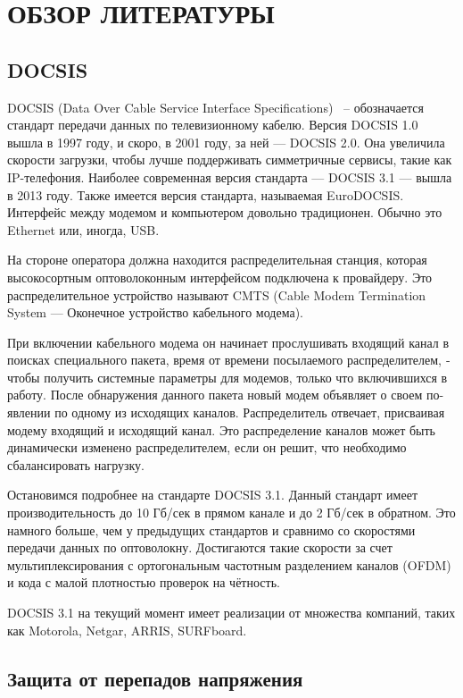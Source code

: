 \section{ОБЗОР ЛИТЕРАТУРЫ}
\label{sec:domain}

\subsection{DOCSIS}

DOCSIS (Data Over Cable Service Interface Specifications) ~-- обозначается стандарт передачи данных по телевизионному кабелю. 
Версия DOCSIS 1.0 вышла в 1997 году, и скоро, в 2001 году, за ней — DOCSIS 2.0. Она увеличила скорости
загрузки, чтобы лучше поддерживать симметричные сервисы, такие как IP-телефония.
Наиболее современная версия стандарта — DOCSIS 3.1 — вышла в 2013 году. Также имеется версия стандарта,
называемая EuroDOCSIS. Интерфейс между модемом и компьютером довольно традиционен. Обычно это
Ethernet или, иногда, USB. 

На стороне оператора должна находится распределительная станция, которая 
высокосортным оптоволоконным интерфейсом подключена к провайдеру. Это 
распределительное устройство называют CMTS (Cable Modem Termination System —
Оконечное устройство кабельного модема). 

При включении кабельного модема он начинает прослушивать входящий канал
в поисках специального пакета, время от времени посылаемого распределителем,
­чтобы получить системные параметры для модемов, только что включившихся
в ра­боту. После обнаружения данного пакета новый модем объявляет о своем по-
явлении по одному из исходящих каналов. Распределитель отвечает, присваивая
модему входящий и исходящий канал. Это распределение каналов может быть динамически 
изменено распределителем, если он решит, что необходимо сбалансировать нагрузку.

Остановимся подробнее на стандарте DOCSIS 3.1. Данный стандарт имеет производительность до 10 Гб/сек в прямом канале и до 2 Гб/сек в обратном. 
Это намного больше, чем у предыдущих стандартов и сравнимо со скоростями передачи данных по оптоволокну. Достигаются такие скорости 
за счет мультиплексирования с ортогональным частотным разделением каналов (OFDM) и кода с малой плотностью проверок на чётность.

DOCSIS 3.1 на текущий момент имеет реализации от множества компаний, таких как Motorola, Netgar, ARRIS, SURFboard.

\subsection{Защита от перепадов напряжения}

